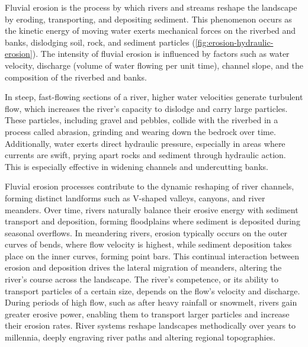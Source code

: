 
    Fluvial erosion is the process by which rivers and streams reshape the landscape by eroding, transporting, and depositing sediment. This phenomenon occurs as the kinetic energy of moving water exerts mechanical forces on the riverbed and banks, dislodging soil, rock, and sediment particles (\cref{fig:erosion-hydraulic-erosion}). The intensity of fluvial erosion is influenced by factors such as water velocity, discharge (volume of water flowing per unit time), channel slope, and the composition of the riverbed and banks.

In steep, fast-flowing sections of a river, higher water velocities generate turbulent flow, which increases the river's capacity to dislodge and carry large particles. These particles, including gravel and pebbles, collide with the riverbed in a process called abrasion, grinding and wearing down the bedrock over time. Additionally, water exerts direct hydraulic pressure, especially in areas where currents are swift, prying apart rocks and sediment through hydraulic action. This is especially effective in widening channels and undercutting banks.

Fluvial erosion processes contribute to the dynamic reshaping of river channels, forming distinct landforms such as V-shaped valleys, canyons, and river meanders. Over time, rivers naturally balance their erosive energy with sediment transport and deposition, forming floodplains where sediment is deposited during seasonal overflows. In meandering rivers, erosion typically occurs on the outer curves of bends, where flow velocity is highest, while sediment deposition takes place on the inner curves, forming point bars. This continual interaction between erosion and deposition drives the lateral migration of meanders, altering the river's course across the landscape. The river's competence, or its ability to transport particles of a certain size, depends on the flow's velocity and discharge. During periods of high flow, such as after heavy rainfall or snowmelt, rivers gain greater erosive power, enabling them to transport larger particles and increase their erosion rates. River systems reshape landscapes methodically over years to millennia, deeply engraving river paths and altering regional topographies.



